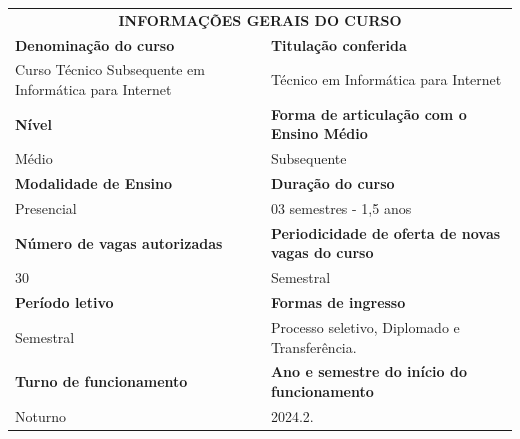 \documentclass[
	12pt,				%
	openright,			%
	twoside,			%
	a4paper,			%
	chapter=TITLE,		%
	english,			%
	french,				%
	spanish,			%
	brazil,				%
	]{abntex2}
\begin{document}
\noindent
\begin{tabularx}{\linewidth}{X l}
	\multicolumn{2}{c}{\cellcolor{gray!40}\textbf{INFORMAÇÕES GERAIS DO CURSO}} \\
	
	\cellcolor{gray!10}\textbf{Denominação do curso} &
	\cellcolor{gray!10}\textbf{Titulação conferida} \\
	Curso Técnico Subsequente em \newline Informática para Internet &
	Técnico em Informática para Internet\\

	
	\cellcolor{gray!10}\textbf{Nível} &
	\cellcolor{gray!10}\textbf{Forma de articulação com o~ \newline Ensino Médio} \\	
	Médio & Subsequente\\
	
	 
	\cellcolor{gray!10}\textbf{Modalidade de Ensino} &
	\cellcolor{gray!10}\textbf{Duração do curso} \\
	Presencial & 03 semestres - 1,5 anos\\
	
	\cellcolor{gray!10}\textbf{Número de vagas autorizadas} &
	\cellcolor{gray!10}\textbf{Periodicidade de oferta de novas vagas do curso} \\
	30 & Semestral\\


	\cellcolor{gray!10}\textbf{Período letivo} &
	\cellcolor{gray!10}\textbf{Formas de ingresso} \\
	Semestral & Processo seletivo, Diplomado e Transferência.\\

	\cellcolor{gray!10}\textbf{Turno de funcionamento} &
	\cellcolor{gray!10}\textbf{Ano e semestre do início \newline do funcionamento} \\
	Noturno & 2024.2.\\	
\end{tabularx}
\vspace{1em}
\end{document}
